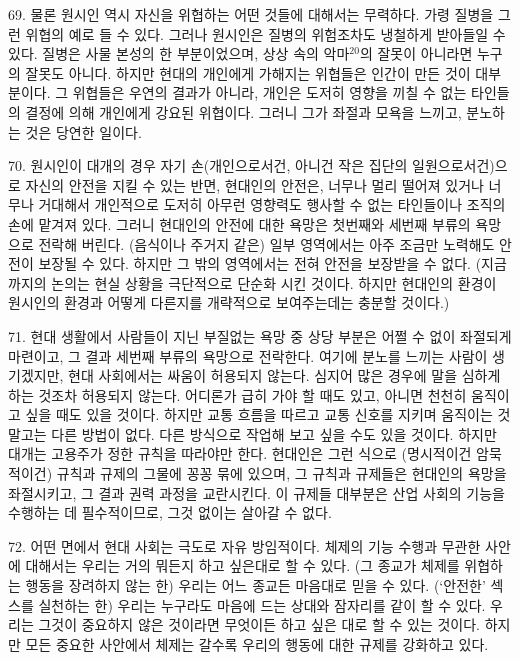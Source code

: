 \documentclass[11pt,a4paper]{article}
\begin{document}
\begin{multicols}{2}
69. 물론 원시인 역시 자신을 위협하는 어떤 것들에 대해서는 무력하다. 가령 질병을 그런 위협의 예로 들 수 있다. 그러나 원시인은 질병의 위험조차도 냉철하게 받아들일 수 있다. 질병은 사물 본성의 한  부분이었으며, 상상 속의 악마\hyperlink{20}{$^{20}$}의 잘못이 아니라면 누구의 잘못도 아니다. 하지만 현대의 개인에게  가해지는 위협들은 인간이 만든 것이 대부분이다. 그 위협들은 우연의 결과가 아니라, 개인은 도저히  영향을 끼칠 수 없는 타인들의 결정에 의해 개인에게 강요된 위협이다. 그러니 그가 좌절과 모욕을  느끼고, 분노하는 것은 당연한 일이다. 


70. 원시인이 대개의 경우 자기 손(개인으로서건, 아니건 작은 집단의 일원으로서건)으로 자신의 안전을  지킬 수 있는 반면, 현대인의 안전은, 너무나 멀리 떨어져 있거나 너무나 거대해서 개인적으로 도저히  아무런 영향력도 행사할 수 없는 타인들이나 조직의 손에 맡겨져 있다. 그러니 현대인의 안전에 대한  욕망은 첫번째와 세번째 부류의 욕망으로 전락해 버린다. (음식이나 주거지 같은) 일부 영역에서는 아주  조금만 노력해도 안전이 보장될 수 있다. 하지만 그 밖의 영역에서는 전혀 안전을 보장받을 수 없다. (지금까지의 논의는 현실 상황을 극단적으로 단순화 시킨 것이다. 하지만 현대인의 환경이 원시인의  환경과 어떻게 다른지를 개략적으로 보여주는데는 충분할 것이다.) 


71. 현대 생활에서 사람들이 지닌 부질없는 욕망 중 상당 부분은 어쩔 수 없이 좌절되게 마련이고, 그  결과 세번째 부류의 욕망으로 전락한다. 여기에 분노를 느끼는 사람이 생기겠지만, 현대 사회에서는  싸움이 허용되지 않는다. 심지어 많은 경우에 말을 심하게 하는 것조차 허용되지 않는다. 어디론가 급히  가야 할 때도 있고, 아니면 천천히 움직이고 싶을 때도 있을 것이다. 하지만 교통 흐름을 따르고 교통  신호를 지키며 움직이는 것 말고는 다른 방법이 없다. 다른 방식으로 작업해 보고 싶을 수도 있을 것이다.  하지만 대개는 고용주가 정한 규칙을 따라야만 한다. 현대인은 그런 식으로 (명시적이건 암묵적이건)  규칙과 규제의 그물에 꽁꽁 묶에 있으며, 그 규칙과 규제들은 현대인의 욕망을 좌절시키고, 그 결과 권력  과정을 교란시킨다. 이 규제들 대부분은 산업 사회의 기능을 수행하는 데 필수적이므로, 그것 없이는  살아갈 수 없다. 


72. 어떤 면에서 현대 사회는 극도로 자유 방임적이다. 체제의 기능 수행과 무관한 사안에 대해서는  우리는 거의 뭐든지 하고 싶은대로 할 수 있다. (그 종교가 체제를 위협하는 행동을 장려하지 않는 한)  우리는 어느 종교든 마음대로 믿을 수 있다. (`안전한' 섹스를 실천하는 한) 우리는 누구라도 마음에 드는  상대와 잠자리를 같이 할 수 있다. 우리는 그것이 중요하지 않은 것이라면 무엇이든 하고 싶은 대로 할 수  있는 것이다. 하지만 모든 중요한 사안에서 체제는 갈수록 우리의 행동에 대한 규제를 강화하고 있다. 



\end{multicols}
\end{document}
